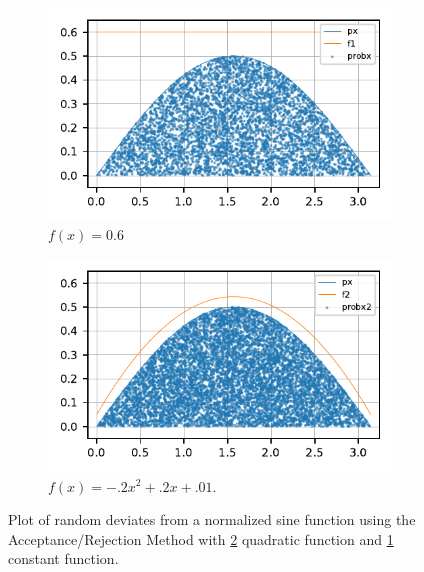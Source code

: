 \begin{figure}
  \centering
  \begin{subfigure}[b]{0.5\textwidth}
    \includegraphics{CodeAndFigures/AcceptanceRejectionPlotf1.pdf}
    \caption{$f(x)=0.6$}
    \label{subfig:constant}
  \end{subfigure}
  \begin{subfigure}[b]{0.5\textwidth}
    \includegraphics{CodeAndFigures/AcceptanceRejectionPlotf2.pdf}
    \caption{$f(x)=-.2x^2+.2x+.01$.}
    \label{subfig:Quadratic}
  \end{subfigure}
  \caption{Plot of random deviates from a normalized sine function using the Acceptance/Rejection Method with \ref{subfig:Quadratic} quadratic function and \ref{subfig:constant} constant function.}
  \label{fig:accRejPlot}
\end{figure}
